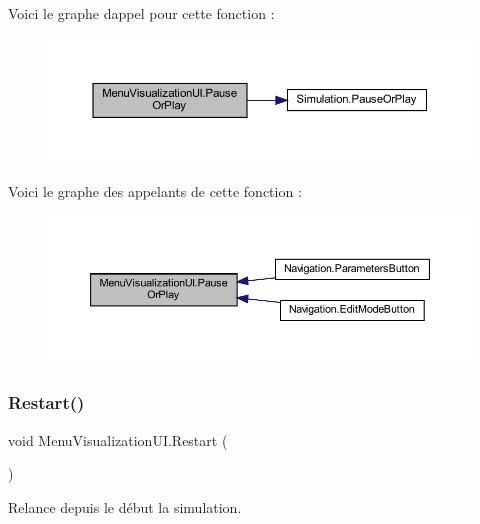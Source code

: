 Voici le graphe d\textquotesingle{}appel pour cette fonction \+:
\nopagebreak
\begin{figure}[H]
\begin{center}
\leavevmode
\includegraphics[width=350pt]{class_menu_visualization_u_i_a9affc75173b7b9e70340b2b934398464_cgraph}
\end{center}
\end{figure}
Voici le graphe des appelants de cette fonction \+:\nopagebreak
\begin{figure}[H]
\begin{center}
\leavevmode
\includegraphics[width=350pt]{class_menu_visualization_u_i_a9affc75173b7b9e70340b2b934398464_icgraph}
\end{center}
\end{figure}
\mbox{\label{class_menu_visualization_u_i_ad71bfeae87aee9f53387e7abf59040c4}} 
\subsubsection{\texorpdfstring{Restart()}{Restart()}}
{\footnotesize\ttfamily void Menu\+Visualization\+U\+I.\+Restart (\begin{DoxyParamCaption}{ }\end{DoxyParamCaption})\hspace{0.3cm}{\ttfamily [inline]}}



Relance depuis le début la simulation. 

